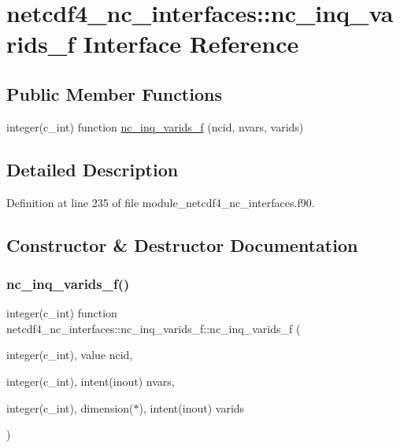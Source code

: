 \hypertarget{interfacenetcdf4__nc__interfaces_1_1nc__inq__varids__f}{}\section{netcdf4\+\_\+nc\+\_\+interfaces\+:\+:nc\+\_\+inq\+\_\+varids\+\_\+f Interface Reference}
\label{interfacenetcdf4__nc__interfaces_1_1nc__inq__varids__f}
\subsection*{Public Member Functions}
\begin{DoxyCompactItemize}
\item 
integer(c\+\_\+int) function \hyperlink{interfacenetcdf4__nc__interfaces_1_1nc__inq__varids__f_a8b0510bfa4d31b6efc698ce99fc74384}{nc\+\_\+inq\+\_\+varids\+\_\+f} (ncid, nvars, varids)
\end{DoxyCompactItemize}


\subsection{Detailed Description}


Definition at line 235 of file module\+\_\+netcdf4\+\_\+nc\+\_\+interfaces.\+f90.



\subsection{Constructor \& Destructor Documentation}
\mbox{\label{interfacenetcdf4__nc__interfaces_1_1nc__inq__varids__f_a8b0510bfa4d31b6efc698ce99fc74384}} 
\subsubsection{\texorpdfstring{nc\+\_\+inq\+\_\+varids\+\_\+f()}{nc\_inq\_varids\_f()}}
{\footnotesize\ttfamily integer(c\+\_\+int) function netcdf4\+\_\+nc\+\_\+interfaces\+::nc\+\_\+inq\+\_\+varids\+\_\+f\+::nc\+\_\+inq\+\_\+varids\+\_\+f (\begin{DoxyParamCaption}\item[{integer(c\+\_\+int), value}]{ncid,  }\item[{integer(c\+\_\+int), intent(inout)}]{nvars,  }\item[{integer(c\+\_\+int), dimension($\ast$), intent(inout)}]{varids }\end{DoxyParamCaption})}




